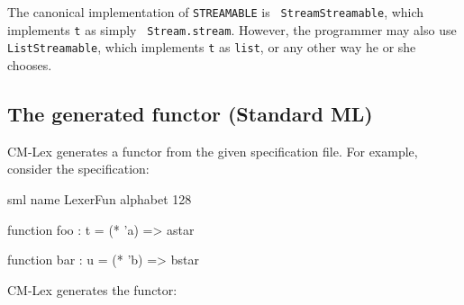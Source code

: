 \documentclass[10pt]{article}
\begin{document}
The canonical implementation of {\tt STREAMABLE} is {\tt
StreamStreamable}, which implements {\tt t} as simply {\tt
Stream.stream}.  However, the programmer may also use {\tt
ListStreamable}, which implements {\tt t} as {\tt list}, or any other
way he or she chooses.


\subsection{The generated functor (Standard ML)}
\label{sec:lex-functor-sml}

CM-Lex generates a functor from the given specification file.  For example,
consider the specification:

\begin{code}
sml
name LexerFun
alphabet 128

function foo : t =
  (* 'a) => astar

function bar : u =
  (* 'b) => bstar
\end{code}


CM-Lex generates the functor:
\end{document}
